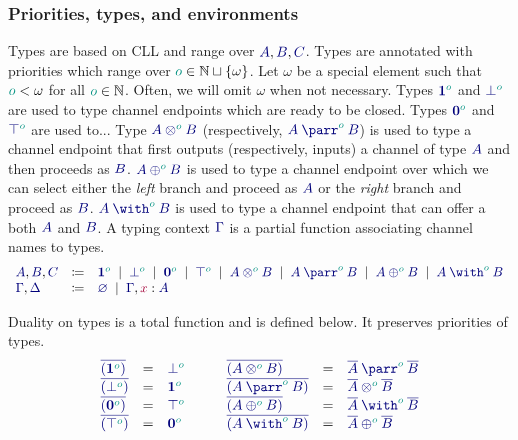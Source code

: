 \documentclass[main.tex]{subfiles}
\begin{document}
\subsubsection{Priorities, types, and environments}
Types are based on CLL and range over $\ty{A}, \ty{B}, \ty{C}$.
Types are annotated with priorities which range over $\cs{o} \in \mathbb{N} \sqcup \{\omega\}$.
Let $\omega$ be a special element such that $\cs{o}<\omega$ for all $\cs{o}\in \mathbb{N}$.
Often, we will omit $\omega$ when not necessary.
Types $\ty{\tyone[\cs{o}]}$ and $\ty{\tybot[\cs{o}]}$
are used to type channel endpoints which are ready to be closed.
Types $\ty{\tynil[\cs{o}]}$ and $\ty{\tytop[\cs{o}]}$ are used to... 
Type $\ty{\tytens[\cs{o}]{A}{B}}$ (respectively, $\ty{\typarr[\cs{o}]{A}{B}}$) is used to type a channel endpoint that first {outputs} (respectively, {inputs}) a channel of type $\ty A$ and then proceeds as $\ty B$.
$\ty{\typlus[\cs{o}]{A}{B}}$ is used to type a channel endpoint over which we can {select} either the \emph{left} branch and proceed as $\ty A$ or the \emph{right} branch and proceed as $\ty B$.
$\ty{\tywith[\cs{o}]{A}{B}}$ is used to type a channel endpoint that can offer a both $\ty A$ and $\ty B$.
A typing context $\ty\Gamma$ is a partial function associating channel names to types.
\[
\begin{array}{lcl}
  \ty{A}, \ty{B}, \ty{C}
  & \coloneqq & \ty{\tyone[\cs{o}]}
    \sep        \ty{\tybot[\cs{o}]}
    \sep        \ty{\tynil[\cs{o}]}
    \sep        \ty{\tytop[\cs{o}]}
    \sep        \ty{\tytens[\cs{o}]{A}{B}}
    \sep        \ty{\typarr[\cs{o}]{A}{B}}
    \sep        \ty{\typlus[\cs{o}]{A}{B}}
    \sep        \ty{\tywith[\cs{o}]{A}{B}}
  \\
  \ty{\Gamma}, \ty{\Delta}
  & \coloneqq & \ty{\emptyenv}
    \sep        \ty{\Gamma}, \tmty{x}{A}
\end{array}
\]

Duality on types is a total function and is defined below. It preserves priorities of types.
\[
\begin{array}{lcl}
  \ty{\co{(\tyone[\cs{o}])}} & = & \ty{\tybot[\cs{o}]} \\
  \ty{\co{(\tybot[\cs{o}])}} & = & \ty{\tyone[\cs{o}]} \\
  \ty{\co{(\tynil[\cs{o}])}} & = & \ty{\tytop[\cs{o}]} \\
  \ty{\co{(\tytop[\cs{o}])}} & = & \ty{\tynil[\cs{o}]}
\end{array}
\qquad
\begin{array}{lcl}
  \ty{\co{(\tytens[\cs{o}]{A}{B})}} & = & \ty{\typarr[\cs{o}]{\co{A}}{\co{B}}} \\
  \ty{\co{(\typarr[\cs{o}]{A}{B})}} & = & \ty{\tytens[\cs{o}]{\co{A}}{\co{B}}} \\
  \ty{\co{(\typlus[\cs{o}]{A}{B})}} & = & \ty{\tywith[\cs{o}]{\co{A}}{\co{B}}} \\
  \ty{\co{(\tywith[\cs{o}]{A}{B})}} & = & \ty{\typlus[\cs{o}]{\co{A}}{\co{B}}}
\end{array}
\]
\end{document}
